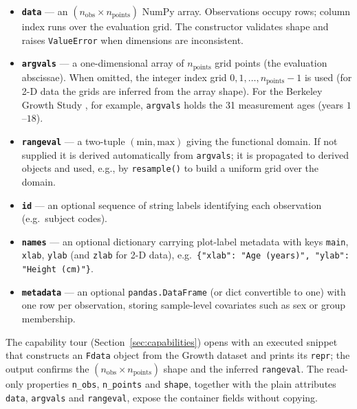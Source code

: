 \begin{itemize}
  \item \textbf{\texttt{data}} --- an $(n_\mathrm{obs} \times n_\mathrm{points})$
    NumPy array.  Observations occupy rows; column index runs over the
    evaluation grid.  The constructor validates shape and raises
    \texttt{ValueError} when dimensions are inconsistent.

  \item \textbf{\texttt{argvals}} --- a one-dimensional array of $n_\mathrm{points}$
    grid points (the evaluation abscissae).  When omitted, the integer index
    grid $0, 1, \ldots, n_\mathrm{points}-1$ is used (for 2-D data the grids
    are inferred from the array shape).  For the Berkeley Growth Study \citep{tuddenham_snyder_1954}, for example,
    \texttt{argvals} holds the 31 measurement ages (years $1$--$18$).

  \item \textbf{\texttt{rangeval}} --- a two-tuple
    $(\mathrm{min}, \mathrm{max})$ giving the functional domain.  If not
    supplied it is derived automatically from \texttt{argvals}; it is
    propagated to derived objects and used, e.g., by \texttt{resample()} to
    build a uniform grid over the domain.

  \item \textbf{\texttt{id}} --- an optional sequence of string labels
    identifying each observation (e.g.\ subject codes).

  \item \textbf{\texttt{names}} --- an optional dictionary carrying
    plot-label metadata with keys \texttt{main}, \texttt{xlab},
    \texttt{ylab} (and \texttt{zlab} for 2-D data), e.g.\
    \texttt{\{"xlab": "Age (years)", "ylab": "Height (cm)"\}}.

  \item \textbf{\texttt{metadata}} --- an optional
    \texttt{pandas.DataFrame} (or dict convertible to one) with one row per
    observation, storing sample-level covariates such as sex or group
    membership.
\end{itemize}

The capability tour (Section~\ref{sec:capabilities}) opens with an executed
snippet that constructs an \texttt{Fdata} object from the Growth dataset and
prints its \texttt{repr}; the output confirms the $(n_\mathrm{obs} \times
n_\mathrm{points})$ shape and the inferred \texttt{rangeval}.  The read-only
properties \texttt{n\_obs}, \texttt{n\_points} and \texttt{shape}, together
with the plain attributes \texttt{data}, \texttt{argvals} and
\texttt{rangeval}, expose the container fields without copying.

